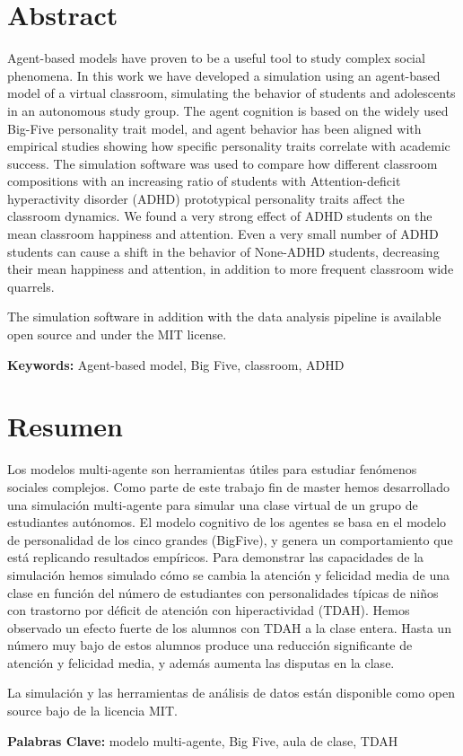 \chapter{Abstract}

Agent-based models have proven to be a useful tool to study complex social phenomena.
In this work we have developed a simulation using an agent-based model of a virtual
classroom, simulating the behavior of students and adolescents in an autonomous
study group. The agent cognition is based on the widely used Big-Five personality
trait model, and agent behavior has been aligned with empirical studies showing
how specific personality traits correlate with academic success. The simulation
software was used to compare how different classroom compositions with an increasing
ratio of students with Attention-deficit hyperactivity disorder (ADHD) prototypical
personality traits affect the classroom dynamics. We found a very strong effect
of ADHD students on the mean classroom happiness and attention. Even a very small
number of ADHD students can cause a shift in the behavior of None-ADHD students,
decreasing their mean happiness and attention, in addition to more frequent classroom
wide quarrels.

\bb

The simulation software in addition with the data analysis pipeline is available
open source and under the MIT license. 

\bb

{\bf Keywords:} Agent-based model, Big Five, classroom, ADHD

\chapter{Resumen}

Los modelos multi-agente son herramientas útiles para estudiar fenómenos sociales complejos.
Como parte de este trabajo fin de master hemos desarrollado una simulación multi-agente para
simular una clase virtual de un grupo de estudiantes autónomos. El modelo
cognitivo de los agentes se basa en el modelo de personalidad de los cinco grandes
(BigFive), y genera un comportamiento que está replicando resultados empíricos.
Para demonstrar las capacidades de la simulación hemos simulado cómo se cambia
la atención y felicidad media de una clase en función del número de estudiantes
con personalidades típicas de niños con trastorno por déficit de atención con
hiperactividad (TDAH). Hemos observado un efecto fuerte de los alumnos con TDAH
a la clase entera. Hasta un número muy bajo de estos alumnos produce una
reducción significante de atención y felicidad media, y además aumenta las
disputas en la clase.

\bb

La simulación y las herramientas de análisis de datos están disponible como open
source bajo de la licencia MIT.

\bb

{\bf Palabras Clave:} modelo multi-agente, Big Five, aula de clase, TDAH
